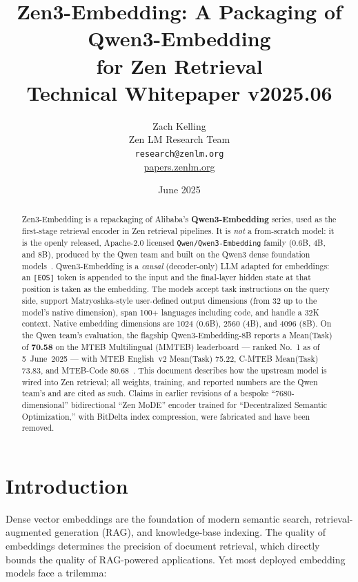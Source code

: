 \documentclass[11pt,a4paper]{article}
\title{\textbf{Zen3-Embedding: A Packaging of Qwen3-Embedding\\
for Zen Retrieval}\\
\large Technical Whitepaper v2025.06}
\author{Zach Kelling \\ Zen LM Research Team\\
\texttt{research@zenlm.org}\\
\href{https://papers.zenlm.org}{papers.zenlm.org}}
\date{June 2025}
\begin{document}
\maketitle

\begin{abstract}
Zen3-Embedding is a repackaging of Alibaba's \textbf{Qwen3-Embedding} series, used as the
first-stage retrieval encoder in Zen retrieval pipelines. It is \emph{not} a from-scratch
model: it is the openly released, Apache-2.0 licensed \texttt{Qwen/Qwen3-Embedding} family
(0.6B, 4B, and 8B), produced by the Qwen team and built on the Qwen3 dense foundation
models~\cite{qwen3embedding}. Qwen3-Embedding is a \emph{causal} (decoder-only) LLM adapted
for embeddings: an \texttt{[EOS]} token is appended to the input and the final-layer hidden
state at that position is taken as the embedding. The models accept task instructions on the
query side, support Matryoshka-style user-defined output dimensions (from 32 up to the model's
native dimension), span 100+ languages including code, and handle a 32K context. Native
embedding dimensions are 1024 (0.6B), 2560 (4B), and 4096 (8B). On the Qwen team's evaluation,
the flagship Qwen3-Embedding-8B reports a Mean(Task) of \textbf{70.58} on the MTEB
Multilingual (MMTEB) leaderboard --- ranked No.~1 as of 5~June~2025 --- with MTEB English~v2
Mean(Task) 75.22, C-MTEB Mean(Task) 73.83, and MTEB-Code 80.68~\cite{qwen3embedding}. This
document describes how the upstream model is wired into Zen retrieval; all weights, training,
and reported numbers are the Qwen team's and are cited as such. Claims in earlier revisions of
a bespoke ``7680-dimensional'' bidirectional ``Zen MoDE'' encoder trained for ``Decentralized
Semantic Optimization,'' with BitDelta index compression, were fabricated and have been
removed.
\end{abstract}

\tableofcontents
\newpage

\section{Introduction}
\label{sec:intro}

Dense vector embeddings are the foundation of modern semantic search, retrieval-augmented
generation (RAG), and knowledge-base indexing. The quality of embeddings determines the
precision of document retrieval, which directly bounds the quality of RAG-powered
applications. Yet most deployed embedding models face a trilemma:
\end{document}
